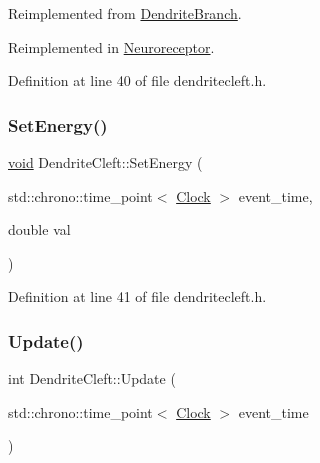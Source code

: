 Reimplemented from \mbox{\hyperlink{class_dendrite_branch_a2ce03fbad4a70564eeaafb62debd4d74}{Dendrite\+Branch}}.



Reimplemented in \mbox{\hyperlink{class_neuroreceptor_a0660a316ef44cf723509f720acd16f24}{Neuroreceptor}}.



Definition at line 40 of file dendritecleft.\+h.

\mbox{\label{class_dendrite_cleft_a7e09ccb70936deabde9c12457cec949c}} 
\subsubsection{\texorpdfstring{Set\+Energy()}{SetEnergy()}}
{\footnotesize\ttfamily \mbox{\hyperlink{glad_8h_a950fc91edb4504f62f1c577bf4727c29}{void}} Dendrite\+Cleft\+::\+Set\+Energy (\begin{DoxyParamCaption}\item[{std\+::chrono\+::time\+\_\+point$<$ \mbox{\hyperlink{universe_8h_a0ef8d951d1ca5ab3cfaf7ab4c7a6fd80}{Clock}} $>$}]{event\+\_\+time,  }\item[{double}]{val }\end{DoxyParamCaption})\hspace{0.3cm}{\ttfamily [inline]}}



Definition at line 41 of file dendritecleft.\+h.

\mbox{\label{class_dendrite_cleft_a3a75af4d6fd97c9635134509f170a04e}} 
\subsubsection{\texorpdfstring{Update()}{Update()}}
{\footnotesize\ttfamily int Dendrite\+Cleft\+::\+Update (\begin{DoxyParamCaption}\item[{std\+::chrono\+::time\+\_\+point$<$ \mbox{\hyperlink{universe_8h_a0ef8d951d1ca5ab3cfaf7ab4c7a6fd80}{Clock}} $>$}]{event\+\_\+time }\end{DoxyParamCaption})}



